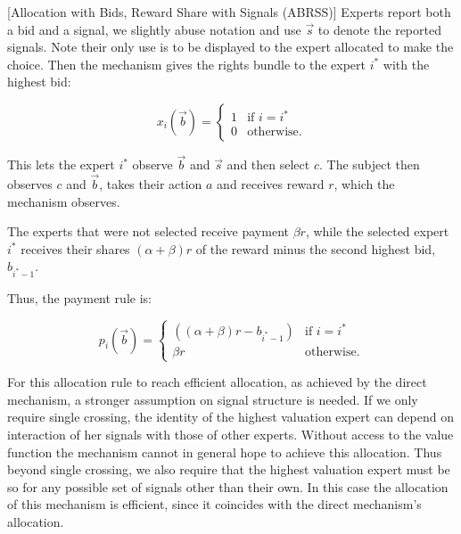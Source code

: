 \begin{mech}\label{mech:Direct}[Allocation with Bids, Reward Share with Signals (ABRSS)]
	Experts report both a bid and a signal, we slightly abuse notation and use $\vec s$ to denote the reported signals. Note their only use is to be displayed to the expert allocated to make the choice.
	Then the mechanism gives the rights bundle to the expert $i^*$ with the highest bid:
	
   $$x_i(\vec{b}) = \begin{cases} 1 & \text{if } i = i^* \\ 0 & \text{otherwise.} \end{cases}$$
	
      This lets the expert $i^*$ observe  $\vec{b}$ and $\vec s$ and then select $c$. The subject then observes $c$ and $\vec{b}$, takes their action $a$ and receives reward $r$, which the mechanism observes. 

	The experts that were not selected receive  payment $\beta r$, while the selected expert $i^*$ receives their shares $(\alpha + \beta) r$ of the reward minus the second highest bid, $b_{i^*-1}$.

	Thus, the payment rule is:
	
   $$p_i(\vec b)= \begin{cases} ((\alpha + \beta)r - b_{i^*-1})& \text{if }i = i^* \\ \beta r & \text{otherwise.} \end{cases}$$
\end{mech}



For this allocation rule to reach efficient allocation, as achieved by the direct mechanism, a stronger assumption on signal structure is needed. If we only require single crossing, the identity of the highest valuation expert can depend on interaction of her signals with those of other experts. Without access to the value function the mechanism cannot in general hope to achieve this allocation.
Thus beyond single crossing, we also require that the highest valuation expert must be so for any possible set of signals other than their own. In this case the allocation of this mechanism is efficient, since it coincides with the direct mechanism's allocation.

